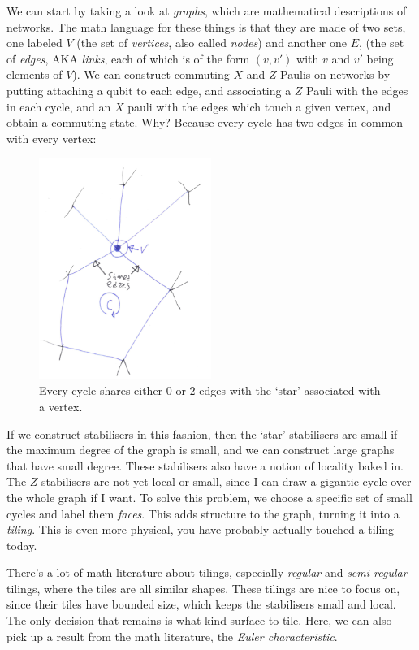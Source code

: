 \documentclass[10pt,a4paper, english]{scrartcl}
\begin{document}
We can start by taking a look at \emph{graphs}, which are mathematical descriptions of networks. 
The math language for these things is that they are made of two sets, one labeled $V$ (the set of \emph{vertices}, also called \emph{nodes}) and another one $E$, (the set of \emph{edges}, AKA \emph{links}, each of which is of the form $(v,v')$ with $v$ and $v'$ being elements of $V$). 
We can construct commuting $X$ and $Z$ Paulis on networks by putting attaching a qubit to each edge, and associating a $Z$ Pauli with the edges in each cycle, and an $X$ pauli with the edges which touch a given vertex, and obtain a commuting state. 
Why? Because every cycle has two edges in common with every vertex:
\begin{figure}[!h]
\centering
\includegraphics[width=0.5\textwidth]{graph_intersection.pdf}
\caption{Every cycle shares either $0$ or $2$ edges with the `star' associated with a vertex.}
\end{figure}
If we construct stabilisers in this fashion, then the `star' stabilisers are small if the maximum degree of the graph is small, and we can construct large graphs that have small degree.
These stabilisers also have a notion of locality baked in. 
The $Z$ stabilisers are not yet local or small, since I can draw a gigantic cycle over the whole graph if I want. 
To solve this problem, we choose a specific set of small cycles and label them \emph{faces}.
This adds structure to the graph, turning it into a \emph{tiling}. 
This is even more physical, you have probably actually touched a tiling today. 

There's a lot of math literature about tilings, especially \emph{regular} and \emph{semi-regular} tilings, where the tiles are all similar shapes. 
These tilings are nice to focus on, since their tiles have bounded size, which keeps the stabilisers small and local. 
The only decision that remains is what kind surface to tile.
Here, we can also pick up a result from the math literature, the \emph{Euler characteristic}. 
\end{document}

